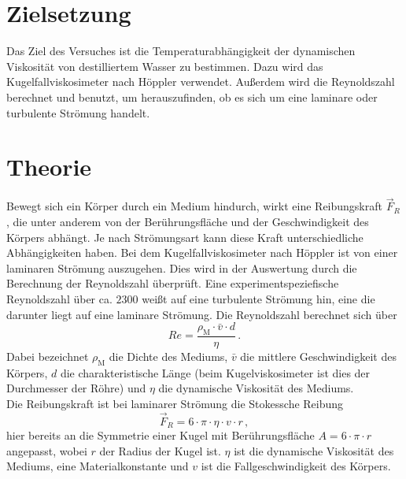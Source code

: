 \section{Zielsetzung}
\label{sec:Zielsetzung}
Das Ziel des Versuches ist die Temperaturabhängigkeit der dynamischen 
Viskosität von destilliertem Wasser zu bestimmen. Dazu wird das 
Kugelfallviskosimeter nach Höppler verwendet. Außerdem wird die Reynoldszahl 
berechnet und benutzt, um herauszufinden, ob es sich um eine laminare oder
turbulente Strömung handelt.
%
%
%
\section{Theorie}
    \label{sec:Theorie}
    Bewegt sich ein Körper durch ein Medium hindurch, wirkt eine Reibungskraft 
    $\vec{F}_{R}$, die unter anderem von der Berührungsfläche und der Geschwindigkeit
    des Körpers abhängt. Je nach Strömungsart kann diese Kraft 
    unterschiedliche Abhängigkeiten haben. Bei dem Kugelfallviskosimeter nach 
    Höppler ist von einer laminaren Strömung auszugehen. 
    Dies wird in der Auswertung durch die
    Berechnung der Reynoldszahl überprüft. Eine experimentspeziefische 
    Reynoldszahl über ca. $2300$ weißt auf eine turbulente Strömung hin, eine die
    darunter liegt auf eine laminare Strömung. Die Reynoldszahl berechnet sich
    über 
    \begin{equation}
        Re = \frac{\rho_{\text{M}} \cdot \bar{v} \cdot d}{\eta}\,. 
        \label{eqn:Reynoldszahl}
    \end{equation}
    Dabei bezeichnet $\rho_{\text{M}}$ die Dichte des Mediums, $\bar{v}$
    die mittlere Geschwindigkeit des Körpers, $d$ die charakteristische 
    Länge (beim Kugelviskosimeter ist dies der Durchmesser der Röhre)
    und $\eta$ die dynamische Viskosität des Mediums. \\
    Die Reibungskraft ist bei laminarer Strömung die Stokessche Reibung
    \begin{equation}
        \vec{F}_{R} = 6 \cdot \pi \cdot \eta \cdot v \cdot r \, , 
        \label{eqn:Stokesreibungskraft}
    \end{equation}
    hier bereits an die Symmetrie einer Kugel mit Berührungsfläche 
    $A = 6 \cdot \pi \cdot r$ angepasst, wobei $r$ der Radius der Kugel ist. 
    $\eta$ ist die dynamische Viskosität des Mediums, eine Materialkonstante und
    $v$ ist die Fallgeschwindigkeit des Körpers. \\
%
%
%
